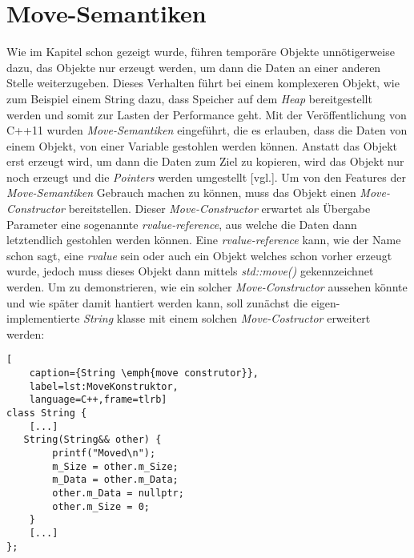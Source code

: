 \section{Move-Semantiken}\label{sec:move}
Wie im Kapitel \emph{} schon gezeigt wurde, führen temporäre Objekte
unnötigerweise
dazu, das Objekte nur erzeugt werden, um dann die Daten an einer anderen Stelle weiterzugeben.
Dieses Verhalten führt bei einem komplexeren Objekt, wie zum Beispiel einem String dazu, dass
Speicher auf dem \emph{Heap} bereitgestellt werden und somit zur Lasten der Performance geht.
\newline
\newline
Mit der Veröffentlichung von C++11 wurden \emph{Move-Semantiken} eingeführt, die es erlauben, dass
die Daten von einem Objekt, von einer Variable gestohlen werden können. Anstatt das Objekt
erst erzeugt wird, um dann die Daten zum Ziel zu kopieren, wird das Objekt nur noch erzeugt und
die \emph{Pointers} werden umgestellt \cite{VisualisingC++}[vgl.]. Um von den Features der
\emph{Move-Semantiken} Gebrauch machen zu können, muss das Objekt einen \emph{Move-Constructor}
bereitstellen. Dieser \emph{Move-Constructor} erwartet als Übergabe Parameter eine sogenannte
\emph{rvalue-reference}, aus welche die Daten dann letztendlich gestohlen werden können. Eine
\emph{rvalue-reference} kann, wie der Name schon sagt, eine \emph{rvalue} sein oder auch ein Objekt
welches schon vorher erzeugt wurde, jedoch muss dieses Objekt dann mittels \emph{std::move()}
gekennzeichnet werden.
\newline
\newline
Um zu demonstrieren, wie ein solcher \emph{Move-Constructor} aussehen könnte und wie später damit
hantiert werden kann, soll zunächst die eigen-implementierte \emph{String} klasse mit einem solchen
\emph{Move-Costructor} erweitert werden:

\begin{lstlisting}[
    caption={String \emph{move construtor}},
    label=lst:MoveKonstruktor,
    language=C++,frame=tlrb]
class String {
	[...]
   String(String&& other) {
        printf("Moved\n");
        m_Size = other.m_Size;
        m_Data = other.m_Data;
        other.m_Data = nullptr;
        other.m_Size = 0;
    }
	[...]
};
\end{lstlisting}

